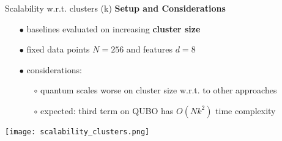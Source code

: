 		\begin{frame}[allowframebreaks]{Scalability w.r.t. clusters (k)}
			\textbf{Setup and Considerations}
			\begin{itemize}
				\item[$\bullet$] baselines evaluated on increasing \textbf{cluster size}
				\item[$\bullet$] fixed data points $N=256$ and features $d=8$
				\item[$\bullet$] considerations:
				\begin{itemize}
					\item[$\circ$] quantum scales worse on cluster size w.r.t. to other approaches
					\item[$\circ$] expected: third term on QUBO has $O(Nk^2)$ time complexity
				\end{itemize} 
			\end{itemize}
			\begin{center}
				\texttt{[image: scalability\_clusters.png]}
			\end{center}
		\end{frame}

